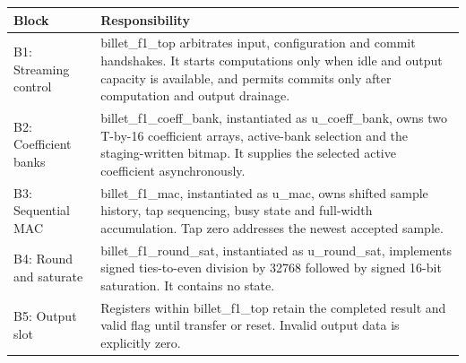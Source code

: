 \documentclass[11pt,a4paper]{article}
\begin{document}
{\small\renewcommand{\arraystretch}{1.18}\begin{longtable}{@{}L{0.24\textwidth}|L{0.7\textwidth}@{}}\toprule

\textbf{Block} & \textbf{Responsibility}\\\midrule\endhead

B1: Streaming control & billet\_\allowbreak{}f1\_\allowbreak{}top arbitrates input,\allowbreak{} configuration and commit handshakes. It starts computations only when idle and output capacity is available,\allowbreak{} and permits commits only after computation and output drainage.\\[2pt]\hline

B2: Coefficient banks & billet\_\allowbreak{}f1\_\allowbreak{}coeff\_\allowbreak{}bank,\allowbreak{} instantiated as u\_\allowbreak{}coeff\_\allowbreak{}bank,\allowbreak{} owns two T-by-16 coefficient arrays,\allowbreak{} active-bank selection and the staging-written bitmap. It supplies the selected active coefficient asynchronously.\\[2pt]\hline

B3: Sequential MAC & billet\_\allowbreak{}f1\_\allowbreak{}mac,\allowbreak{} instantiated as u\_\allowbreak{}mac,\allowbreak{} owns shifted sample history,\allowbreak{} tap sequencing,\allowbreak{} busy state and full-width accumulation. Tap zero addresses the newest accepted sample.\\[2pt]\hline

B4: Round and saturate & billet\_\allowbreak{}f1\_\allowbreak{}round\_\allowbreak{}sat,\allowbreak{} instantiated as u\_\allowbreak{}round\_\allowbreak{}sat,\allowbreak{} implements signed ties-to-even division by 32768 followed by signed 16-bit saturation. It contains no state.\\[2pt]\hline

B5: Output slot & Registers within billet\_\allowbreak{}f1\_\allowbreak{}top retain the completed result and valid flag until transfer or reset. Invalid output data is explicitly zero.\\[2pt]\hline

\bottomrule\end{longtable}}
\end{document}
